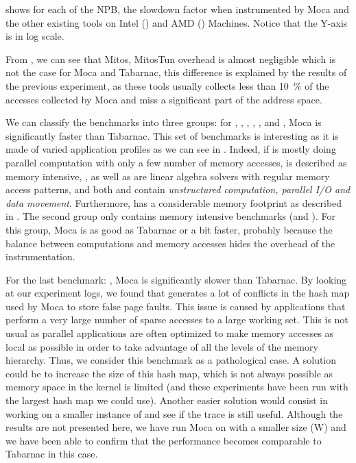  shows for each of the \gls{NPB}, the slowdown factor when instrumented by \gls{Moca} and the other existing tools on Intel () and AMD () Machines.
Notice that the Y-axis is in log scale.

From , we can see that \gls{Mitos}, MitosTun overhead is almost negligible which is not the case for \gls{Moca} and \gls{Tabarnac}, this difference is explained by the results of the previous experiment, as these tools usually collects less than \SI{10}{\%} of the accesses collected by \gls{Moca} and miss a significant part of the address space.

We can classify the benchmarks into three groups: for \BT, \CG, \DC,  \EP, \LU, \SP and \UA, \gls{Moca} is significantly faster than \gls{Tabarnac}.
This set of benchmarks is interesting as it is made of varied application profiles as we can see in .
Indeed, if \EP is mostly doing parallel computation with only a few number of memory accesses, \CG is described as memory intensive, \BT, \LU as well as \SP are linear algebra solvers with regular memory access patterns, and both \UA and \DC contain \emph{unstructured computation, parallel I/O and data movement}.
Furthermore, \DC has a considerable memory footprint as described in .
The second group only contains memory intensive benchmarks (\FT and
\IS). For this group, \gls{Moca} is as good as \gls{Tabarnac} or a bit faster, probably
because the balance between computations and memory accesses hides the
overhead of the instrumentation.

For the last benchmark: \MG, \gls{Moca} is significantly slower than \gls{Tabarnac}.
By looking at our experiment logs, we found that \MG generates a lot of conflicts in the hash map used by \gls{Moca} to store false page faults.
This issue is caused by applications that perform a very large number of sparse accesses to a large working set.
This is not usual as parallel applications are often optimized to make memory accesses as local as possible in order to take advantage of all the levels of the memory hierarchy.
Thus, we consider this benchmark as a pathological case.
A solution could be to increase the size of this hash map, which is not always possible as memory space in the kernel is limited (and these experiments have been run with the largest hash map we could use).
Another easier solution would consist in working on a smaller instance of \MG and see if the trace is still useful.
Although the results are not presented here, we have run \gls{Moca} on \MG with a smaller size (W) and we have been able to confirm that the performance becomes comparable to \gls{Tabarnac} in this case.

